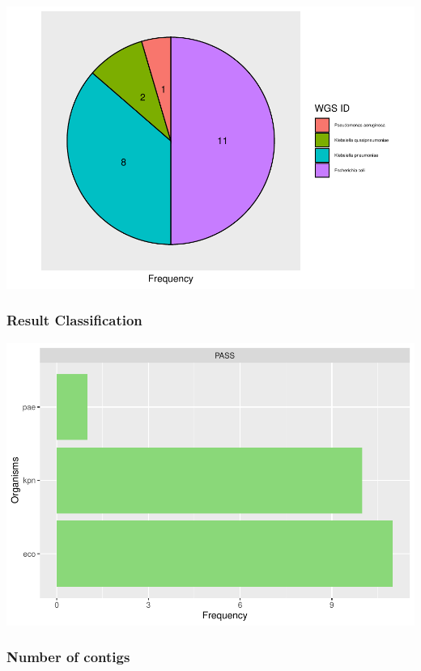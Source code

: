 \documentclass[
  a4paper,
]{article}
\begin{document}
\includegraphics{qualifyr_report_2024-05-03_files/figure-latex/pie_chart-1.pdf}

\subsubsection{Result Classification}\label{result-classification}

\includegraphics{qualifyr_report_2024-05-03_files/figure-latex/organism results-1.pdf}

\subsubsection{Number of contigs}\label{number-of-contigs}
\end{document}
